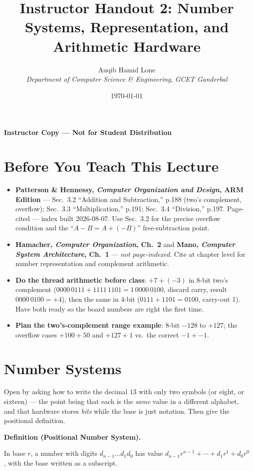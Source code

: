 \documentclass[11pt]{article}
\title{Instructor Handout 2: Number Systems, Representation, and Arithmetic Hardware}
\author{Auqib Hamid Lone\\[0.3em]
  \emph{Department of Computer Science \& Engineering}, \emph{GCET Ganderbal}}
\date{\today}
\newenvironment{definitionbox}[1]{%
  \par\noindent\textbf{Definition (#1).}\ \itshape
}{\par\vspace{0.3em}}
\begin{document}
\maketitle
{\centering\large\color{negative}\textbf{Instructor Copy --- Not for Student Distribution}\par}
\vspace{0.5cm}

\section{Before You Teach This Lecture}

\begin{itemize}
  \item \textbf{Patterson \& Hennessy, \textit{Computer Organization and Design}, ARM Edition} --- Sec.~3.2 ``Addition and Subtraction,'' p.188 (two's complement, overflow); Sec.~3.3 ``Multiplication,'' p.191; Sec.~3.4 ``Division,'' p.197. Page-cited --- index built 2026-08-07. Use Sec.~3.2 for the precise overflow condition and the ``$A-B = A + (-B)$'' free-subtraction point.
  \item \textbf{Hamacher, \textit{Computer Organization}, Ch.~2} and \textbf{Mano, \textit{Computer System Architecture}, Ch.~1} --- \emph{not page-indexed}. Cite at chapter level for number representation and complement arithmetic.
  \item \textbf{Do the thread arithmetic before class}: $+7 + (-3)$ in 8-bit two's complement ($0000\,0111 + 1111\,1101 = 1\,0000\,0100$, discard carry, result $0000\,0100 = +4$), then the same in 4-bit ($0111 + 1101 = 0100$, carry-out 1). Have both ready so the board numbers are right the first time.
  \item \textbf{Plan the two's-complement range example}: 8-bit $-128$ to $+127$; the overflow cases $+100+50$ and $+127+1$ vs.\ the correct $-1+-1$.
\end{itemize}

\section{Number Systems}

Open by asking how to write the decimal $13$ with only two symbols (or eight, or sixteen) --- the point being that each is the \emph{same} value in a different alphabet, and that hardware stores \emph{bits} while the base is just notation. Then give the positional definition.

\begin{definitionbox}{Positional Number System}
In base $r$, a number with digits $d_{n-1}\dots d_1 d_0$ has value $d_{n-1} r^{n-1} + \cdots + d_1 r^1 + d_0 r^0$, with the base written as a subscript.
\end{definitionbox}
\end{document}
